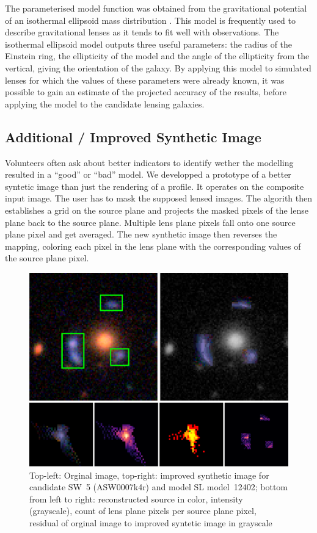 \documentclass[fleqn,usenatbib]{mnras}
\newcommand{\asw}[1]{ASW000#1}
\newcommand{\sw}[1]{SW~#1}
\newcommand{\model}[1]{SL model~#1}
\begin{document}
The parameterised model function was obtained from the gravitational potential of an isothermal ellipsoid mass distribution \cite{2001astro.ph..2341K}.
This model is frequently used to describe gravitational lenses as it tends to fit well with observations.
The isothermal ellipsoid model outputs three useful parameters: the radius of the Einstein ring, the ellipticity of the model and the angle of the ellipticity from the vertical, giving the orientation of the galaxy.
By applying this model to simulated lenses for which the values of these parameters were already known, it was possible to gain an estimate of the projected accuracy of the results, before applying the model to the candidate lensing galaxies.


\subsection{Additional / Improved Synthetic Image}

Volunteers often ask about better indicators to identify wether the modelling resulted in a ``good'' or ``bad'' model.
We developped a prototype of a better syntetic image than just the rendering of a  profile.
It operates on the composite input image.
The user has to mask the supposed lensed images.
The algorith then establishes a grid on the source plane and projects the masked pixels of the lense plane back to the source plane.
Multiple lens plane pixels fall onto one source plane pixel and get averaged.
The new synthetic image then reverses the mapping, coloring each pixel in the lens plane with the corresponding values of the source plane pixel.

\begin{figure}
  \includegraphics[width=\linewidth]{img/new_synth_img_detailed}
  \caption{
      Top-left: Orginal image, top-right: improved synthetic image for candidate \sw{5} (\asw{7k4r}) and model \model{12402};
      bottom from left to right:
        reconstructed source in color,
        intensity (grayscale),
        count of lens plane pixels per source plane pixel,
        residual of orginal image to improved syntetic image in grayscale
    }
  \label{fig:synthimg}
\end{figure}
\end{document}
